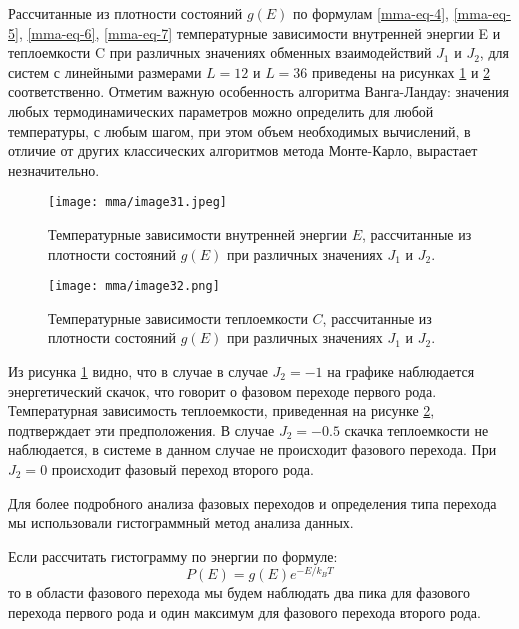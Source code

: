 Рассчитанные из плотности состояний $g(E)$ по формулам \eqref{mma-eq-4}, \eqref{mma-eq-5}, \eqref{mma-eq-6}, \eqref{mma-eq-7} температурные зависимости внутренней энергии E и теплоемкости C при различных значениях обменных взаимодействий $J_1$ и $J_2$, для систем с линейными размерами $L=12$ и $L=36$ приведены на рисунках \ref{mma-fig-7} и \ref{mma-fig-8} соответственно. Отметим важную особенность алгоритма Ванга-Ландау: значения любых термодинамических параметров можно определить для любой температуры, с любым шагом, при этом объем необходимых вычислений, в отличие от других классических алгоритмов метода Монте-Карло, вырастает незначительно.
\begin{figure}[h]
    \begin{center}
        \texttt{[image: mma/image31.jpeg]}
    \end{center}
    \caption{Температурные зависимости внутренней энергии $E$, рассчитанные из плотности состояний $g(E)$ при различных значениях $J_1$ и $J_2$.}
    \label{mma-fig-7}
\end{figure}
\begin{figure}[h]
    \begin{center}
        \texttt{[image: mma/image32.png]}
    \end{center}
    \caption{Температурные зависимости теплоемкости $C$, рассчитанные из плотности состояний $g(E)$ при различных значениях $J_1$ и $J_2$.}
    \label{mma-fig-8}
\end{figure}

Из рисунка \ref{mma-fig-7} видно, что в случае в случае $J_2=-1$ на графике наблюдается энергетический скачок, что говорит о фазовом переходе первого рода. Температурная зависимость теплоемкости, приведенная на рисунке \ref{mma-fig-8}, подтверждает эти предположения. В случае $J_2=-0.5$ скачка теплоемкости не наблюдается, в системе в данном случае не происходит фазового перехода. При $J_2=0$ происходит фазовый переход второго рода.

Для более подробного анализа фазовых переходов и определения типа перехода мы использовали гистограммный метод анализа данных.

Если рассчитать гистограмму по энергии по формуле:
\begin{equation}
    \label{mma-eq-8}
    P(E) = g(E) e^{-E/k_B T}
\end{equation}
то в области фазового перехода мы будем наблюдать два пика для фазового перехода первого рода и один максимум для фазового перехода второго рода.

